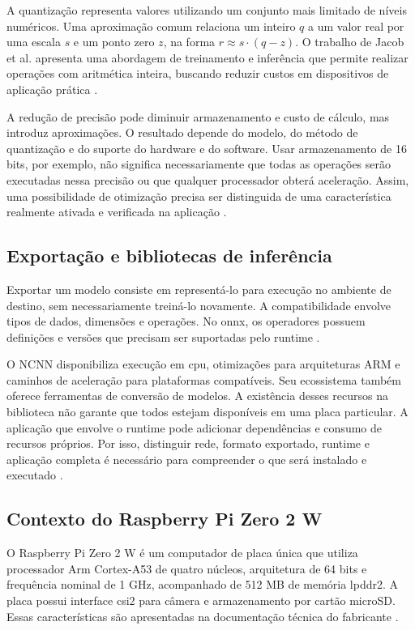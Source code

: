 A quantização representa valores utilizando um conjunto mais limitado de níveis numéricos. Uma aproximação comum relaciona um inteiro \(q\) a um valor real por uma escala \(s\) e um ponto zero \(z\), na forma \(r\approx s\cdot(q-z)\). O trabalho de Jacob et al. apresenta uma abordagem de treinamento e inferência que permite realizar operações com aritmética inteira, buscando reduzir custos em dispositivos de aplicação prática \cite{jacob}.

A redução de precisão pode diminuir armazenamento e custo de cálculo, mas introduz aproximações. O resultado depende do modelo, do método de quantização e do suporte do hardware e do software. Usar armazenamento de 16 bits, por exemplo, não significa necessariamente que todas as operações serão executadas nessa precisão ou que qualquer processador obterá aceleração. Assim, uma possibilidade de otimização precisa ser distinguida de uma característica realmente ativada e verificada na aplicação \cite{jacob,ncnn}.

\subsection{Exportação e bibliotecas de inferência}
\label{subsec:exportacao-runtime}

Exportar um modelo consiste em representá-lo para execução no ambiente de destino, sem necessariamente treiná-lo novamente. A compatibilidade envolve tipos de dados, dimensões e operações. No \gls{onnx}, os operadores possuem definições e versões que precisam ser suportadas pelo runtime \cite{onnx}.

O NCNN disponibiliza execução em \gls{cpu}, otimizações para arquiteturas ARM e caminhos de aceleração para plataformas compatíveis. Seu ecossistema também oferece ferramentas de conversão de modelos. A existência desses recursos na biblioteca não garante que todos estejam disponíveis em uma placa particular. A aplicação que envolve o runtime pode adicionar dependências e consumo de recursos próprios. Por isso, distinguir rede, formato exportado, runtime e aplicação completa é necessário para compreender o que será instalado e executado \cite{ncnn}.

\subsection{Contexto do Raspberry Pi Zero 2 W}
\label{subsec:raspberry-zero2}

O Raspberry Pi Zero 2 W é um computador de placa única que utiliza processador Arm Cortex-A53 de quatro núcleos, arquitetura de 64 bits e frequência nominal de 1 GHz, acompanhado de 512 MB de memória \gls{lpddr2}. A placa possui interface \gls{csi2} para câmera e armazenamento por cartão microSD. Essas características são apresentadas na documentação técnica do fabricante \cite[p. 2--3]{raspberry}.


